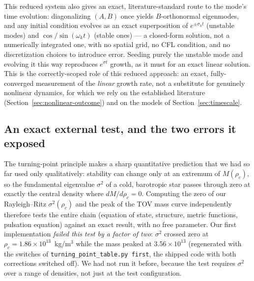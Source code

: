 \documentclass[11pt]{article}
\begin{document}
This reduced system also gives an exact, literature-standard route to the mode's time evolution: diagonalizing $(A,B)$ once yields $B$-orthonormal eigenmodes, and any initial condition evolves as an exact superposition of $e^{\pm\sigma_k t}$ (unstable modes) and $\cos/\sin(\omega_k t)$ (stable ones) --- a closed-form solution, not a numerically integrated one, with no spatial grid, no CFL condition, and no discretization choices to introduce error. Seeding purely the unstable mode and evolving it this way reproduces $e^{\sigma t}$ growth, as it must for an exact linear solution. This is the correctly-scoped role of this reduced approach: an exact, fully-converged measurement of the \emph{linear} growth rate, not a substitute for genuinely nonlinear dynamics, for which we rely on the established literature (Section~\ref{sec:nonlinear-outcome}) and on the models of Section~\ref{sec:timescale}.

\subsection{An exact external test, and the two errors it exposed}
\label{sec:turning-point-test}

The turning-point principle \citep{HTWW1965,HadzicLin2021} makes a sharp quantitative prediction that we had so far used only qualitatively: stability can change only at an extremum of $M(\rho_c)$, so the fundamental eigenvalue $\sigma^2$ of a cold, barotropic star passes through zero at exactly the central density where $dM/d\rho_c=0$. Computing the zero of our Rayleigh--Ritz $\sigma^2(\rho_c)$ and the peak of the TOV mass curve independently therefore tests the entire chain (equation of state, structure, metric functions, pulsation equation) against an exact result, with no free parameter. Our first implementation \emph{failed this test by a factor of two}: $\sigma^2$ crossed zero at $\rho_c=1.86\times10^{13}$~kg/m$^3$ while the mass peaked at $3.56\times10^{13}$ (regenerated with the switches of \texttt{turning\_point\_table.py first}, the shipped code with both corrections switched off). We had not run it before, because the test requires $\sigma^2$ over a range of densities, not just at the test configuration.
\end{document}
